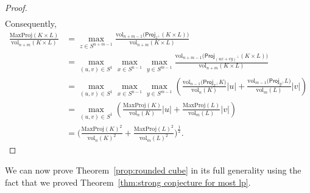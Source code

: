 \documentclass[11pt,reqno]{amsart}
\newcommand{\proj}{\mathsf{Proj}}
\theoremstyle{remark}
\newcommand{\vol}{\mathrm{vol}}
\renewcommand{\1}{\mathbf 1}
\begin{document}
\begin{proof}
\begin{align*}
\end{align*}
Consequently,
\begin{align*}
\frac{\mathrm{MaxProj}(K\times L)}{\vol_{n+m}(K\times L)}&=\max_{z\in S^{n+m-1}}\frac{ \vol_{n+m-1}\big(\proj_{z^\perp}(K\times L)\big)}{\vol_{n+m}(K\times L)}\\&=\max_{(u,v)\in S^1}\max_{x\in S^{n-1}}\max_{y\in S^{m-1}} \frac{ \vol_{n+m-1}\big(\proj_{(ux+vy)^\perp}(K\times L)\big)}{\vol_{n+m}(K\times L)}\\&= \max_{(u,v)\in S^1}\max_{x\in S^{n-1}}\max_{y\in S^{m-1}}\left(\frac{\vol_{n-1}\big(\proj_{x^\perp} K\big)}{\vol_{n}(K)}|u|+\frac{\vol_{m-1}\big(\proj_{y^\perp} L\big)}{\vol_{m}(L)}|v|\right)\\
&= \max_{(u,v)\in S^1} \left(\frac{\mathrm{MaxProj}(K)}{\vol_{n}(K)}|u|+\frac{\mathrm{MaxProj}(L)}{\vol_{m}(L)}|v|\right)\\
&=\bigg(\frac{\mathrm{MaxProj}(K)^2}{\vol_{n}(K)^2}+\frac{\mathrm{MaxProj}(L)^2}{\vol_{m}(L)^2}\bigg)^{\frac12}. \tag*{\qedhere}
\end{align*}
\end{proof}

We can now prove Theorem~\ref{prop:rounded cube}  in its full generality using the fact that we proved Theorem~\ref{thm:strong conjecture for most lp}.
\end{document}
